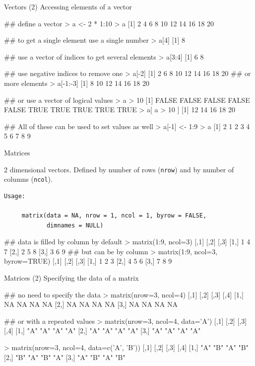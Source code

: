 \documentclass[pdf]{beamer}
\begin{document}
\begin{frame}[fragile]{Vectors (2)}
Accessing elements of a vector

\begin{rcode}
  ## define a vector
  > a <- 2 * 1:10
  > a
  [1]  2  4  6  8 10 12 14 16 18 20

  ## to get a single element use a single number
  > a[4]
  [1] 8

  ## use a vector of indices to get several elements
  > a[3:4]
  [1] 6 8
  
  ## use negative indices to remove one
  > a[-2]
  [1]  2  6  8 10 12 14 16 18 20
  ## or more elements
  > a[-1:-3]
  [1]  8 10 12 14 16 18 20
  
  ## or use a vector of logical values
  > a > 10
  [1] FALSE FALSE FALSE FALSE FALSE  TRUE  TRUE  TRUE  TRUE  TRUE
  > a[ a > 10 ]
  [1] 12 14 16 18 20

  ## All of these can be used to set values as well
  > a[-1] <- 1:9
  > a
  [1] 2 1 2 3 4 5 6 7 8 9
\end{rcode}
\end{frame}

\begin{frame}[fragile]{Matrices}
  
  { \small
  2 dimensional vectors. Defined by number of rows (\texttt{nrow})
  and by number of columns (\texttt{ncol}).

  \begin{verbatim}
Usage:

     matrix(data = NA, nrow = 1, ncol = 1, byrow = FALSE,
            dimnames = NULL)
\end{verbatim}
}
  \begin{rcode}
    ## data is filled by column by default
    > matrix(1:9, ncol=3)
         [,1] [,2] [,3]
    [1,]    1    4    7
    [2,]    2    5    8
    [3,]    3    6    9
    ## but can be by column
    > matrix(1:9, ncol=3, byrow=TRUE)
         [,1] [,2] [,3]
    [1,]    1    2    3
    [2,]    4    5    6
    [3,]    7    8    9

  \end{rcode}
\end{frame}

\begin{frame}[fragile]{Matrices (2)}
  Specifying the data of a matrix

  \begin{rcode}
    ## no need to specify the data
    > matrix(nrow=3, ncol=4)
         [,1] [,2] [,3] [,4]
    [1,]   NA   NA   NA   NA
    [2,]   NA   NA   NA   NA
    [3,]   NA   NA   NA   NA

    ## or with a repeated values
    > matrix(nrow=3, ncol=4, data='A')
        [,1] [,2] [,3] [,4]
    [1,] "A"  "A"  "A"  "A" 
    [2,] "A"  "A"  "A"  "A" 
    [3,] "A"  "A"  "A"  "A" 

    > matrix(nrow=3, ncol=4, data=c('A', 'B'))
        [,1] [,2] [,3] [,4]
    [1,] "A"  "B"  "A"  "B" 
    [2,] "B"  "A"  "B"  "A" 
    [3,] "A"  "B"  "A"  "B" 

  \end{rcode}

\end{frame}
\end{document}
